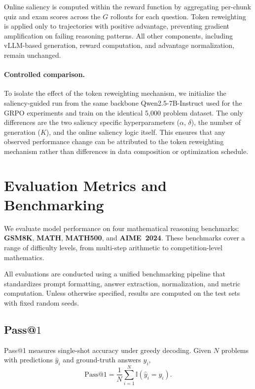 \documentclass[12pt]{report}
\begin{document}
Online saliency is computed within the reward function by aggregating per-chunk quiz and exam scores across the $G$ rollouts for each question. Token reweighting is applied only to trajectories with positive advantage, preventing gradient amplification on failing reasoning patterns. All other components, including vLLM-based generation, reward computation, and advantage normalization, remain unchanged.

\paragraph{Controlled comparison.}
To isolate the effect of the token reweighting mechanism, we initialize
the saliency-guided run from the same backbone Qwen2.5-7B-Instruct
used for the GRPO experiments and train on the identical
5{,}000 problem dataset.  The only differences are the two
saliency specific hyperparameters ($\alpha$, $\delta$), the number of generation ($K$), and the online saliency logic itself.
This ensures that any observed performance change can be attributed to
the token reweighting mechanism rather than differences in data
composition or optimization schedule.

\section{Evaluation Metrics and Benchmarking}

We evaluate model performance on four mathematical reasoning benchmarks:
\textbf{GSM8K}, \textbf{MATH}, \textbf{MATH500}, and \textbf{AIME~2024}.
These benchmarks cover a range of difficulty levels, from multi-step arithmetic to competition-level mathematics.

All evaluations are conducted using a unified benchmarking pipeline that standardizes prompt formatting, answer extraction, normalization, and metric computation. Unless otherwise specified, results are computed on the test sets with fixed random seeds.

\subsection{Pass@\texorpdfstring{$1$}{1}}

Pass@1 measures single-shot accuracy under greedy decoding.
Given $N$ problems with predictions $\widehat{y}_i$ and ground-truth answers $y_i$,
\[
\mathrm{Pass@1}
=
\frac{1}{N}
\sum_{i=1}^{N}
\mathbb{I}\!\left(\widehat{y}_i = y_i\right).
\]
\end{document}
